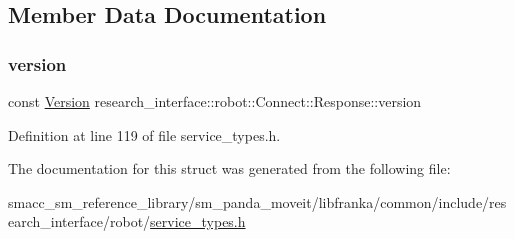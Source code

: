 \subsection{Member Data Documentation}
\mbox{\label{structresearch__interface_1_1robot_1_1Connect_1_1Response_abe8d2a59496e8f98eddc6a4a5aeb7936}} 
\subsubsection{\texorpdfstring{version}{version}}
{\footnotesize\ttfamily const \hyperlink{namespaceresearch__interface_1_1robot_aa7a53d2c58ee4f7aa706b905ddcc7d47}{Version} research\+\_\+interface\+::robot\+::\+Connect\+::\+Response\+::version}



Definition at line 119 of file service\+\_\+types.\+h.



The documentation for this struct was generated from the following file\+:\begin{DoxyCompactItemize}
\item 
smacc\+\_\+sm\+\_\+reference\+\_\+library/sm\+\_\+panda\+\_\+moveit/libfranka/common/include/research\+\_\+interface/robot/\hyperlink{service__types_8h}{service\+\_\+types.\+h}\end{DoxyCompactItemize}
